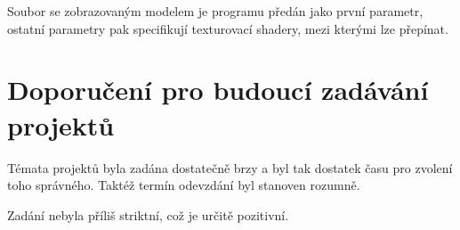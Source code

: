 \documentclass[12pt,a4paper,titlepage,final]{report}
\begin{document}
Soubor se zobrazovaným modelem je programu předán jako první parametr, ostatní parametry pak specifikují texturovací shadery, mezi kterými lze přepínat.

\chapter{Doporučení pro budoucí zadávání projektů}

Témata projektů byla zadána dostatečně brzy a byl tak dostatek času pro zvolení toho správného. Taktéž termín odevzdání byl stanoven rozumně. 

Zadání nebyla příliš striktní, což je určitě pozitivní.






\nocite{gustavson2014,mcewan2012,lengyel}

\end{document}
